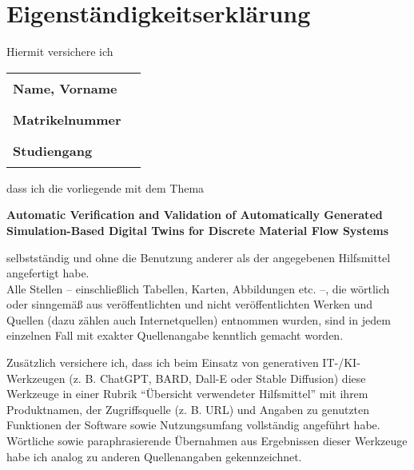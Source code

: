 \chapter*{Eigenständigkeitserklärung}
\thispagestyle{plain}

\vspace{0.5em}

Hiermit versichere ich

\vspace{0.5em}

\noindent
\begin{tabular}{ll}
  \textbf{Name, Vorname}  & \rule{8cm}{0.4pt} \\
  \textbf{Matrikelnummer} & \rule{8cm}{0.4pt} \\
  \textbf{Studiengang}    & \rule{8cm}{0.4pt}
\end{tabular}

\vspace{1em}

\noindent
dass ich die vorliegende mit dem Thema

\begin{center}
\large\bfseries
Automatic Verification and Validation of Automatically Generated \\
Simulation-Based Digital Twins for Discrete Material Flow Systems
\end{center}

\vspace{0.5em}

\noindent
selbstständig und ohne die Benutzung anderer als der angegebenen Hilfsmittel angefertigt habe. \\
Alle Stellen – einschließlich Tabellen, Karten, Abbildungen etc. –, die wörtlich oder sinngemäß aus veröffentlichten und nicht veröffentlichten Werken und Quellen (dazu zählen auch Internetquellen) entnommen wurden, sind in jedem einzelnen Fall mit exakter Quellenangabe kenntlich gemacht worden. \\

\vspace{0.7em}

\noindent
Zusätzlich versichere ich, dass ich beim Einsatz von generativen IT-/KI-Werkzeugen (z. B. ChatGPT, BARD, Dall-E oder Stable Diffusion) diese Werkzeuge in einer Rubrik \enquote{Übersicht verwendeter Hilfsmittel} mit ihrem Produktnamen, der Zugriffsquelle (z. B. URL) und Angaben zu genutzten Funktionen der Software sowie Nutzungsumfang vollständig angeführt habe. Wörtliche sowie paraphrasierende Übernahmen aus Ergebnissen dieser Werkzeuge habe ich analog zu anderen Quellenangaben gekennzeichnet. \\

